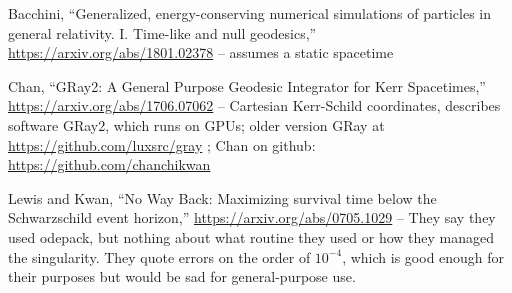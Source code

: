 \documentclass{article}
\begin{document}
Bacchini, ``Generalized, energy-conserving numerical simulations of particles
in general relativity. I. Time-like and null geodesics,''
\url{https://arxiv.org/abs/1801.02378} -- assumes a static spacetime

Chan, ``GRay2: A General Purpose Geodesic Integrator for Kerr Spacetimes,''
\url{https://arxiv.org/abs/1706.07062} --
Cartesian Kerr-Schild coordinates, describes software GRay2, which runs on GPUs;
older version GRay at \url{https://github.com/luxsrc/gray} ; Chan on github:
\url{https://github.com/chanchikwan}

Lewis and Kwan, ``No Way Back: Maximizing survival time below the Schwarzschild event horizon,''
\url{https://arxiv.org/abs/0705.1029} -- They say they used odepack, but nothing about what
routine they used or how they managed the singularity. They quote errors on the order of
$10^{-4}$, which is good enough for their purposes but would be sad for general-purpose use.
\end{document}
